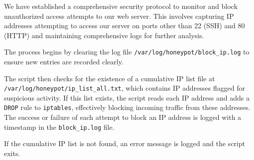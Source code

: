 We have established a comprehensive security protocol to monitor and block unauthorized access attempts to our web server. This involves capturing IP addresses attempting to access our server on ports other than 22 (SSH) and 80 (HTTP) and maintaining comprehensive logs for further analysis.

The process begins by clearing the log file \texttt{/var/log/honeypot/block\_ip.log} to ensure new entries are recorded clearly.

The script then checks for the existence of a cumulative IP list file at \texttt{/var/log/honeypot/ip\_list\_all.txt}, which contains IP addresses flagged for suspicious activity. If this list exists, the script reads each IP address and adds a \texttt{DROP} rule to \texttt{iptables}, effectively blocking incoming traffic from these addresses. The success or failure of each attempt to block an IP address is logged with a timestamp in the \texttt{block\_ip.log} file.

If the cumulative IP list is not found, an error message is logged and the script exits.
